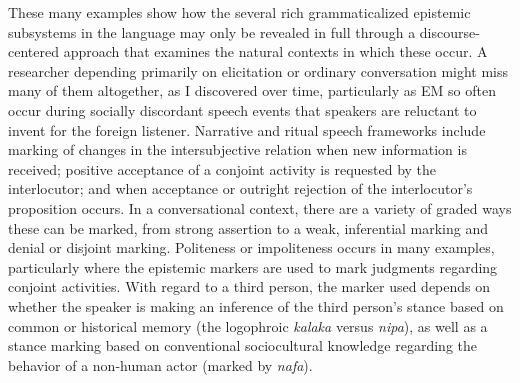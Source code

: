 \documentclass[output=paper]{langsci/langscibook}
\begin{document}
These many examples show how the several rich grammaticalized epistemic subsystems in the language may only be revealed in full through a discourse-centered approach that examines the natural contexts in which these occur.  A researcher depending primarily on elicitation or ordinary conversation might miss many of them altogether, as I discovered over time,  particularly as EM so often occur during socially discordant speech events that speakers are reluctant to invent for the foreign listener. 
Narrative and ritual speech frameworks include marking of changes in the intersubjective relation when new information is received; positive acceptance of a conjoint activity is requested by the interlocutor; and when acceptance or outright rejection of the interlocutor’s proposition occurs.  In a conversational context, there are a variety of graded ways these can be marked, from strong assertion to a weak, inferential marking and denial or disjoint marking.  Politeness or impoliteness occurs in many examples, particularly where the epistemic markers are used to mark judgments regarding conjoint activities.   With regard to a third person, the marker used depends on whether the speaker is making an inference of the third person’s stance based on common or historical memory (the logophroic \textit{kalaka} versus \textit{nipa}), as well as a stance marking based on conventional sociocultural knowledge regarding the behavior of a non-human actor (marked by \textit{nafa}).  
\end{document}
